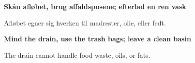 \documentclass{article}
\begin{document}
\maketitle

\null

\vspace{-0.5cm}

\begin{center}

\vspace{1cm}%
\begin{center}%

\fontsize{28}{28}\selectfont\bf Skån afløbet, brug affaldsposene; efterlad en
ren vask \\

\end{center}%
\vspace{0.7cm}%

\vspace{-0.7cm}

\Huge

Afløbet egner sig hverken til madrester, olie, eller fedt.

\english

\vspace{1.5cm}%
\begin{center}%

\fontsize{28}{28}\selectfont\bf Mind the drain, use the trash bags; leave a
clean basin

\end{center}%
\vspace{0.7cm}%

\vspace{-1.1cm}

The drain cannot handle food waste, oils, or fats.

\end{center}

\dansk

\underskriv
\end{document}
